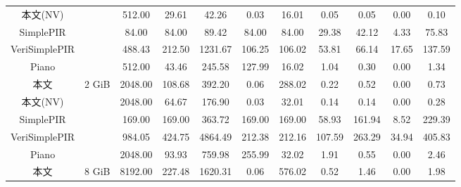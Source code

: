 \begin{table}[]
\begin{tabular}{@{}cc|ccc|cccccc@{}}
        本文(NV)     &                           & 512.00                       & 29.61                      & 42.26    & 0.03                          & \multicolumn{1}{c|}{16.01}   & 0.05   & 0.05   & 0.00        & 0.10   \\
        SimplePIR     &                           & 84.00                        & 84.00                      & 89.42    & 84.00                         & \multicolumn{1}{c|}{84.00}   & 29.38  & 42.12  & 4.33        & 75.83  \\
        VeriSimplePIR &                           & 488.43                       & 212.50                     & 1231.67  & 106.25                        & \multicolumn{1}{c|}{106.02}  & 53.81  & 66.14  & 17.65       & 137.59 \\
        Piano         &                           & 512.00                       & 43.46                      & 245.58   & 127.99                        & \multicolumn{1}{c|}{16.02}   & 1.04   & 0.30   & 0.00        & 1.34   \\ \midrule
        本文         & \multirow{5}{*}{2 GiB}   & 2048.00                      & 108.68                     & 392.20   & 0.06                          & \multicolumn{1}{c|}{288.02}  & 0.22   & 0.52   & 0.00        & 0.73   \\
        本文(NV)     &                           & 2048.00                      & 64.67                      & 176.90   & 0.03                          & \multicolumn{1}{c|}{32.01}   & 0.14   & 0.14   & 0.00        & 0.28   \\
        SimplePIR     &                           & 169.00                       & 169.00                     & 363.72   & 169.00                        & \multicolumn{1}{c|}{169.00}  & 58.93  & 161.94 & 8.52        & 229.39 \\
        VeriSimplePIR &                           & 984.05                       & 424.75                     & 4864.49  & 212.38                        & \multicolumn{1}{c|}{212.16}  & 107.59 & 263.29 & 34.94       & 405.83 \\
        Piano         &                           & 2048.00                      & 93.93                      & 759.98   & 255.99                        & \multicolumn{1}{c|}{32.02}   & 1.91   & 0.55   & 0.00        & 2.46   \\ \midrule
        本文         & \multirow{5}{*}{8 GiB}   & 8192.00                      & 227.48                     & 1620.31  & 0.06                          & \multicolumn{1}{c|}{576.02}  & 0.52   & 1.46   & 0.00        & 1.98   \\

\end{tabular}
\end{table}
